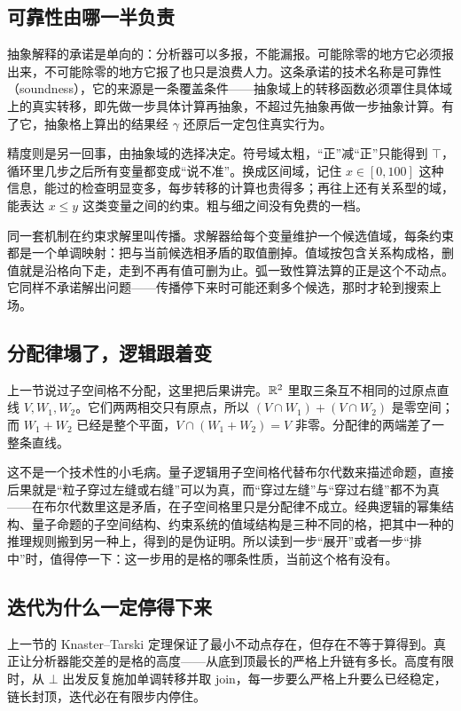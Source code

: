 \subsection{可靠性由哪一半负责}

抽象解释的承诺是单向的：分析器可以多报，不能漏报。可能除零的地方它必须报出来，不可能除零的地方它报了也只是浪费人力。这条承诺的技术名称是可靠性（soundness），它的来源是一条覆盖条件——抽象域上的转移函数必须罩住具体域上的真实转移，即先做一步具体计算再抽象，不超过先抽象再做一步抽象计算。有了它，抽象格上算出的结果经 \(\gamma\) 还原后一定包住真实行为。

精度则是另一回事，由抽象域的选择决定。符号域太粗，``正''减``正''只能得到 \(\top\)，循环里几步之后所有变量都变成``说不准''。换成区间域，记住 \(x\in[0,100]\) 这种信息，能过的检查明显变多，每步转移的计算也贵得多；再往上还有关系型的域，能表达 \(x\le y\) 这类变量之间的约束。粗与细之间没有免费的一档。

同一套机制在约束求解里叫传播。求解器给每个变量维护一个候选值域，每条约束都是一个单调映射：把与当前候选相矛盾的取值删掉。值域按包含关系构成格，删值就是沿格向下走，走到不再有值可删为止。弧一致性算法算的正是这个不动点。它同样不承诺解出问题——传播停下来时可能还剩多个候选，那时才轮到搜索上场。

\subsection{分配律塌了，逻辑跟着变}

上一节说过子空间格不分配，这里把后果讲完。\(\mathbb{R}^2\) 里取三条互不相同的过原点直线 \(V,W_1,W_2\)。它们两两相交只有原点，所以 \((V\cap W_1)+(V\cap W_2)\) 是零空间；而 \(W_1+W_2\) 已经是整个平面，\(V\cap(W_1+W_2)=V\) 非零。分配律的两端差了一整条直线。

这不是一个技术性的小毛病。量子逻辑用子空间格代替布尔代数来描述命题，直接后果就是``粒子穿过左缝或右缝''可以为真，而``穿过左缝''与``穿过右缝''都不为真——在布尔代数里这是矛盾，在子空间格里只是分配律不成立。经典逻辑的幂集结构、量子命题的子空间结构、约束系统的值域结构是三种不同的格，把其中一种的推理规则搬到另一种上，得到的是伪证明。所以读到一步``展开''或者一步``排中''时，值得停一下：这一步用的是格的哪条性质，当前这个格有没有。

\subsection{迭代为什么一定停得下来}

上一节的 Knaster--Tarski 定理保证了最小不动点存在，但存在不等于算得到。真正让分析器能交差的是格的高度——从底到顶最长的严格上升链有多长。高度有限时，从 \(\bot\) 出发反复施加单调转移并取 join，每一步要么严格上升要么已经稳定，链长封顶，迭代必在有限步内停住。

